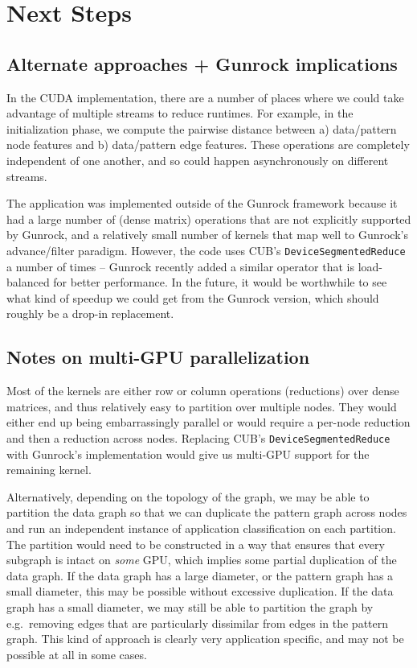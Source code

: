 \documentclass[10pt,oneside]{memoir}
\begin{document}
\hypertarget{next-steps}{%
\section{Next Steps}\label{next-steps}}

\hypertarget{alternate-approaches-gunrock-implications}{%
\subsection{Alternate approaches + Gunrock
implications}\label{alternate-approaches-gunrock-implications}}

In the CUDA implementation, there are a number of places where we could
take advantage of multiple streams to reduce runtimes. For example, in
the initialization phase, we compute the pairwise distance between a)
data/pattern node features and b) data/pattern edge features. These
operations are completely independent of one another, and so could
happen asynchronously on different streams.

The application was implemented outside of the Gunrock framework because
it had a large number of (dense matrix) operations that are not
explicitly supported by Gunrock, and a relatively small number of
kernels that map well to Gunrock's advance/filter paradigm. However, the
code uses CUB's \texttt{DeviceSegmentedReduce} a number of times --
Gunrock recently added a similar operator that is load-balanced for
better performance. In the future, it would be worthwhile to see what
kind of speedup we could get from the Gunrock version, which should
roughly be a drop-in replacement.

\hypertarget{notes-on-multi-gpu-parallelization}{%
\subsection{Notes on multi-GPU
parallelization}\label{notes-on-multi-gpu-parallelization}}

Most of the kernels are either row or column operations (reductions)
over dense matrices, and thus relatively easy to partition over multiple
nodes. They would either end up being embarrassingly parallel or would
require a per-node reduction and then a reduction across nodes.
Replacing CUB's \texttt{DeviceSegmentedReduce} with Gunrock's
implementation would give us multi-GPU support for the remaining kernel.

Alternatively, depending on the topology of the graph, we may be able to
partition the data graph so that we can duplicate the pattern graph
across nodes and run an independent instance of application
classification on each partition. The partition would need to be
constructed in a way that ensures that every subgraph is intact on
\emph{some} GPU, which implies some partial duplication of the data
graph. If the data graph has a large diameter, or the pattern graph has
a small diameter, this may be possible without excessive duplication. If
the data graph has a small diameter, we may still be able to partition
the graph by e.g.~removing edges that are particularly dissimilar from
edges in the pattern graph. This kind of approach is clearly very
application specific, and may not be possible at all in some cases.
\end{document}
